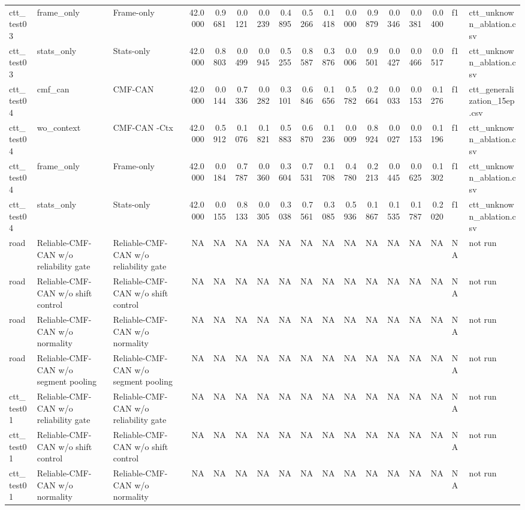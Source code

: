 \begin{tabular}{lllrrrrrrrrrrrrll}
ctt\_test03 & frame\_only & Frame-only & 42.0000 & 0.9681 & 0.0121 & 0.0239 & 0.4895 & 0.5266 & 0.1418 & 0.0000 & 0.9879 & 0.0346 & 0.0381 & 0.0400 & f1 & ctt\_unknown\_ablation.csv \\
ctt\_test03 & stats\_only & Stats-only & 42.0000 & 0.8803 & 0.0499 & 0.0945 & 0.5255 & 0.8587 & 0.3876 & 0.0006 & 0.9501 & 0.0427 & 0.0466 & 0.0517 & f1 & ctt\_unknown\_ablation.csv \\
ctt\_test04 & cmf\_can & CMF-CAN & 42.0000 & 0.0144 & 0.7336 & 0.0282 & 0.3101 & 0.6846 & 0.1656 & 0.5782 & 0.2664 & 0.0033 & 0.0153 & 0.1276 & f1 & ctt\_generalization\_15ep.csv \\
ctt\_test04 & wo\_context & CMF-CAN -Ctx & 42.0000 & 0.5912 & 0.1076 & 0.1821 & 0.5883 & 0.6870 & 0.1236 & 0.0009 & 0.8924 & 0.0027 & 0.0153 & 0.1196 & f1 & ctt\_unknown\_ablation.csv \\
ctt\_test04 & frame\_only & Frame-only & 42.0000 & 0.0184 & 0.7787 & 0.0360 & 0.3604 & 0.7531 & 0.1708 & 0.4780 & 0.2213 & 0.0445 & 0.0625 & 0.1302 & f1 & ctt\_unknown\_ablation.csv \\
ctt\_test04 & stats\_only & Stats-only & 42.0000 & 0.0155 & 0.8133 & 0.0305 & 0.3038 & 0.7561 & 0.3085 & 0.5936 & 0.1867 & 0.1535 & 0.1787 & 0.2020 & f1 & ctt\_unknown\_ablation.csv \\
road & Reliable-CMF-CAN w/o reliability gate & Reliable-CMF-CAN w/o reliability gate & NA & NA & NA & NA & NA & NA & NA & NA & NA & NA & NA & NA & NA & not run \\
road & Reliable-CMF-CAN w/o shift control & Reliable-CMF-CAN w/o shift control & NA & NA & NA & NA & NA & NA & NA & NA & NA & NA & NA & NA & NA & not run \\
road & Reliable-CMF-CAN w/o normality & Reliable-CMF-CAN w/o normality & NA & NA & NA & NA & NA & NA & NA & NA & NA & NA & NA & NA & NA & not run \\
road & Reliable-CMF-CAN w/o segment pooling & Reliable-CMF-CAN w/o segment pooling & NA & NA & NA & NA & NA & NA & NA & NA & NA & NA & NA & NA & NA & not run \\
ctt\_test01 & Reliable-CMF-CAN w/o reliability gate & Reliable-CMF-CAN w/o reliability gate & NA & NA & NA & NA & NA & NA & NA & NA & NA & NA & NA & NA & NA & not run \\
ctt\_test01 & Reliable-CMF-CAN w/o shift control & Reliable-CMF-CAN w/o shift control & NA & NA & NA & NA & NA & NA & NA & NA & NA & NA & NA & NA & NA & not run \\
ctt\_test01 & Reliable-CMF-CAN w/o normality & Reliable-CMF-CAN w/o normality & NA & NA & NA & NA & NA & NA & NA & NA & NA & NA & NA & NA & NA & not run \\

\end{tabular}
